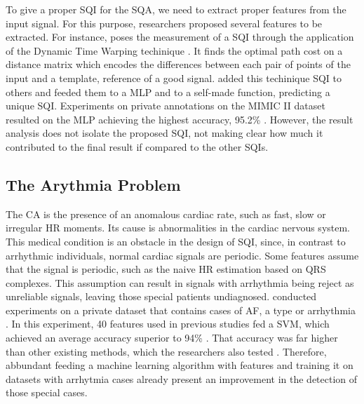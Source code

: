 To give a proper \acrshort{SQI} for the \acrshort{SQA}, we need to extract proper features from the input signal. For this purpose, researchers proposed several features to be extracted. For instance, \citeauthor{review-1} poses the measurement of a \acrshort{SQI} through the application of the Dynamic Time Warping techinique \cite{review-1}. It finds the optimal path cost on a distance matrix which encodes the differences between each pair of points of the input and a template, reference of a good signal. \citeauthor{review-1} added this techinique \acrshort{SQI} to others and feeded them to a \acrshort{MLP} and to a self-made function, predicting a unique \acrshort{SQI}. Experiments on private annotations on the MIMIC II dataset resulted on the \acrshort{MLP} achieving the highest accuracy, 95.2\% \cite{review-1}. However, the result analysis does not isolate the proposed \acrshort{SQI}, not making clear how much it contributed to the final result if compared to the other \acrshort{SQI}s.      
	


\subsection{The Arythmia Problem}
\label{sec:arythmia}

The \acrfull{CA} is the presence of an anomalous cardiac rate, such as fast, slow or irregular \acrshort{HR} moments. Its cause is abnormalities in the cardiac nervous system. This medical condition is an obstacle in the design of \acrshort{SQI}, since, in contrast to arrhythmic individuals, normal cardiac signals are periodic. Some features assume that the signal is periodic, such as the naive \acrshort{HR} estimation based on QRS complexes. This assumption can result in signals with arrhythmia being reject as unreliable signals, leaving those special patients undiagnosed. \citeauthor{review-5} conducted experiments on a private dataset that contains cases of \acrfull{AF}, a type or arrhythmia \cite{review-5}. In this experiment, 40 features used in previous studies fed a \acrshort{SVM}, which achieved an average accuracy superior to 94\% \cite{review-5}. That accuracy was far higher than other existing methods, which the researchers also tested \cite{review-5}. Therefore, abbundant feeding a machine learning algorithm with features and training it on datasets with arrhytmia cases already present an improvement in the detection of those special cases.

